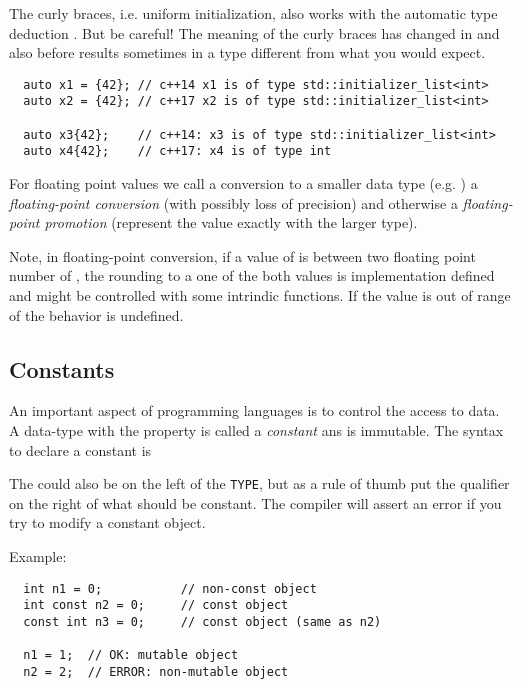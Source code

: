 \begin{rem}
  The\marginpar{[\cxx{17}]} curly braces, i.e. uniform initialization, also works with the automatic type deduction . But be careful! The meaning
  of the curly braces has changed in  and also before results sometimes in a type different from what you would expect.
  \begin{verbatim}
  auto x1 = {42}; // c++14 x1 is of type std::initializer_list<int>
  auto x2 = {42}; // c++17 x2 is of type std::initializer_list<int>

  auto x3{42};    // c++14: x3 is of type std::initializer_list<int>
  auto x4{42};    // c++17: x4 is of type int
  \end{verbatim}
\end{rem}

\begin{defn}
  For floating point values we call a conversion to a smaller data type (e.g. ) a \emph{floating-point conversion} (with possibly loss of precision) and otherwise a \emph{floating-point promotion} (represent the value exactly with the larger type).
\end{defn}

\begin{rem}
  Note, in floating-point conversion, if a value of  is between two floating point number of , the rounding to a one of the both values is implementation defined and might be controlled with some intrindic functions. If the value is out of range of  the behavior is undefined.
\end{rem}

\subsection{Constants\label{sec:const}}
An important aspect of programming languages is to control the access to data. A data-type with the property 
is called a \emph{constant} ans is immutable. The syntax to declare a constant is


The  could also be on the left of the \texttt{TYPE}, but as a rule of thumb put the qualifier  on the right of what
should be constant. The compiler will assert an error if you try to modify a constant object.

Example:
\begin{verbatim}
  int n1 = 0;           // non-const object
  int const n2 = 0;     // const object
  const int n3 = 0;     // const object (same as n2)

  n1 = 1;  // OK: mutable object
  n2 = 2;  // ERROR: non-mutable object
\end{verbatim}

